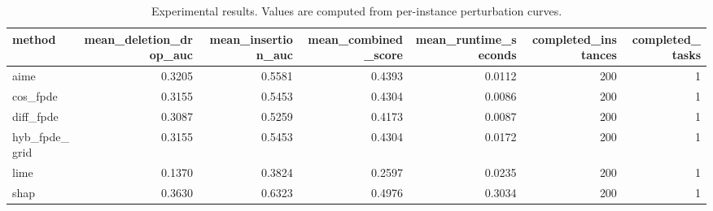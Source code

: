 \begin{table}[t]
\caption{Experimental results. Values are computed from per-instance perturbation curves.}
\label{tab:main_results_computed}
\centering
\begin{tabular}{lrrrrrr}
\toprule
method & mean\_deletion\_drop\_auc & mean\_insertion\_auc & mean\_combined\_score & mean\_runtime\_seconds & completed\_instances & completed\_tasks \\
\midrule
aime & 0.3205 & 0.5581 & 0.4393 & 0.0112 & 200 & 1 \\
cos\_fpde & 0.3155 & 0.5453 & 0.4304 & 0.0086 & 200 & 1 \\
diff\_fpde & 0.3087 & 0.5259 & 0.4173 & 0.0087 & 200 & 1 \\
hyb\_fpde\_grid & 0.3155 & 0.5453 & 0.4304 & 0.0172 & 200 & 1 \\
lime & 0.1370 & 0.3824 & 0.2597 & 0.0235 & 200 & 1 \\
shap & 0.3630 & 0.6323 & 0.4976 & 0.3034 & 200 & 1 \\
\bottomrule
\end{tabular}

\end{table}
